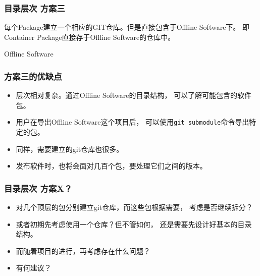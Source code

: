 \begin{frame}
    \frametitle{目录层次 方案三}
    每个Package建立一个相应的GIT仓库。但是直接包含于Offline Software下。
    即Container Package直接存于Offline Software的仓库中。
    \renewcommand*\DTstylecomment{\rmfamily\color{red}\textsc}
    \begin{block}{Offline Software}
    \end{block}
\end{frame}

\begin{frame}
    \frametitle{方案三的优缺点}
    \begin{itemize}
        \item 层次相对复杂。通过Offline Software的目录结构，
              可以了解可能包含的软件包。
        \item 用户在导出Offline Software这个项目后，
              可以使用{\tt git submodule}命令导出特定的包。
        \item 同样，需要建立的git仓库也很多。
        \item 发布软件时，也将会面对几百个包，要处理它们之间的版本。
    \end{itemize}
\end{frame}

\begin{frame}
    \frametitle{目录层次 方案X？}
    \begin{itemize}
        \item 对几个顶层的包分别建立git仓库，而这些包根据需要，
              考虑是否继续拆分？
        \item 或者初期先考虑使用一个仓库？但不管如何，
              还是需要先设计好基本的目录结构。
        \item 而随着项目的进行，再考虑存在什么问题？
        \item 有何建议？
    \end{itemize}
\end{frame}

